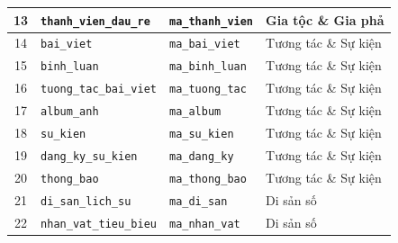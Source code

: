 \begin{table}[htbp]
\begin{tabularx}{\textwidth}{|c|l|p{4.2cm}|X|}
13 & \texttt{thanh\_vien\_dau\_re}& \texttt{ma\_thanh\_vien}         & Gia tộc \& Gia phả \\ \hline
14 & \texttt{bai\_viet}           & \texttt{ma\_bai\_viet}           & Tương tác \& Sự kiện \\ \hline
15 & \texttt{binh\_luan}          & \texttt{ma\_binh\_luan}          & Tương tác \& Sự kiện \\ \hline
16 & \texttt{tuong\_tac\_bai\_viet}& \texttt{ma\_tuong\_tac}         & Tương tác \& Sự kiện \\ \hline
17 & \texttt{album\_anh}          & \texttt{ma\_album}               & Tương tác \& Sự kiện \\ \hline
18 & \texttt{su\_kien}            & \texttt{ma\_su\_kien}            & Tương tác \& Sự kiện \\ \hline
19 & \texttt{dang\_ky\_su\_kien}  & \texttt{ma\_dang\_ky}            & Tương tác \& Sự kiện \\ \hline
20 & \texttt{thong\_bao}          & \texttt{ma\_thong\_bao}          & Tương tác \& Sự kiện \\ \hline
21 & \texttt{di\_san\_lich\_su}   & \texttt{ma\_di\_san}             & Di sản số \\ \hline
22 & \texttt{nhan\_vat\_tieu\_bieu}& \texttt{ma\_nhan\_vat}          & Di sản số \\ \hline
\end{tabularx}
\end{table}
